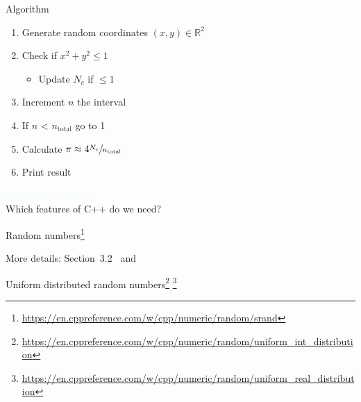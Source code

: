 \documentclass[\classoption]{beamer}
\begin{document}
\begin{frame}{Algorithm}
\begin{enumerate}
\item Generate random coordinates $(x,y)\in \mathbb{R}^2$
\item Check if $x^2+y^2 \leq 1$
\begin{itemize}
\item Update $N_c$ if $\leq 1$
\end{itemize}
\item Increment $n$ the interval  
\item If $n$ < $n_{\text{total}}$ go to 1
\item Calculate $\pi \approx 4 \sfrac{N_c}{n_\text{total}}$
\item Print result
\end{enumerate}
\vspace{0.25cm}
\textcolor{azure}{Interactive question:} \\
\vspace{0.125cm}
Which features of C++ do we need? \\
\vspace{0.25cm}
\end{frame}

\begin{frame}{Random numbers\footnote{\tiny\url{https://en.cppreference.com/w/cpp/numeric/random/srand}}}


More details: Section~3.2~\cite{knuth1997art2} and \cite{matsumoto1998mersenne}
\end{frame}

\begin{frame}{Uniform distributed random numbers\footnote{\tiny\url{https://en.cppreference.com/w/cpp/numeric/random/uniform_int_distribution}} \footnote{\tiny\url{https://en.cppreference.com/w/cpp/numeric/random/uniform_real_distribution}}}



\end{frame}
\end{document}
